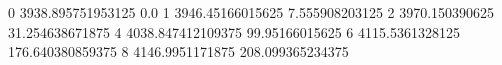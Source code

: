 0 3938.895751953125 0.0
1 3946.45166015625 7.555908203125
2 3970.150390625 31.254638671875
4 4038.847412109375 99.95166015625
6 4115.5361328125 176.640380859375
8 4146.9951171875 208.099365234375
